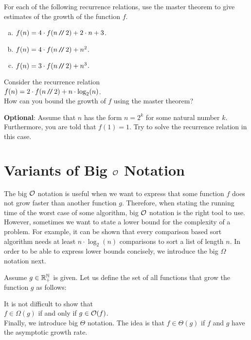 \exercise
For each of the following recurrence relations, use the master theorem to give estimates of the
growth of the function $f$. 
\begin{enumerate}[(a)]
\item $f(n) = 4 \cdot f(n \mbox{\,\texttt{/}$\!$\texttt{/}\,} 2) + 2 \cdot n + 3$.
\item $f(n) = 4 \cdot f(n \mbox{\,\texttt{/}$\!$\texttt{/}\,} 2) + n^2$.
\item $f(n) = 3 \cdot f(n \mbox{\,\texttt{/}$\!$\texttt{/}\,} 2) + n^3$.  \eox
\end{enumerate}

\exercise
Consider the recurrence relation
\\[0.2cm]
\hspace*{1.3cm}
$f(n) = 2 \cdot f(n \mbox{\,\texttt{/}$\!$\texttt{/}\,} 2) + n \cdot \log_2(n)$.
\\[0.2cm] 
How can you bound the growth of $f$ using the master theorem? 
\vspace*{0.1cm}

\noindent
\textbf{Optional}: Assume that $n$ has the form $n = 2^k$ for some natural number $k$.
Furthermore, you are told that $f(1) = 1$.  Try to solve the recurrence relation in this case.
\eox

\section{Variants of Big $\mathcal{O}$ Notation}
The big $\mathcal{O}$ notation is useful when we want to express that some function $f$ does not grow faster
than another function $g$.  Therefore, when stating the running time of the worst case of some algorithm,
big $\mathcal{O}$ notation is the right tool to use.  However, sometimes we want to state a lower bound for
the complexity of a problem.  For example, it can be shown that every comparison based sort algorithm needs at least
$n \cdot \log_2(n)$ comparisons to sort a list of length $n$.  In order to be able to express lower
bounds concisely, we introduce the big $\Omega$ notation next.

\begin{Definition}[$\Omega(g)$] 
  Assume $g \in {\mathbb R}_+^{{\mathbb N}}$ is given.   Let us define the set of all functions that grow 
   the function $g$ as follows:
  \\[0.2cm]
  \hspace*{0.5cm} 
  \colorbox{red}{}
  \eox
\end{Definition}
It is not difficult to show that
\\[0.2cm]
\hspace*{1.3cm}
 $f \in \Omega(g)$ \quad if and only if \quad $g \in \mathcal{O}(f)$.
\\[0.2cm]
Finally, we introduce big $\Theta$ notation.  The idea is that $f \in \Theta(g)$ if 
$f$ and $g$ have the  asymptotic growth rate. 

